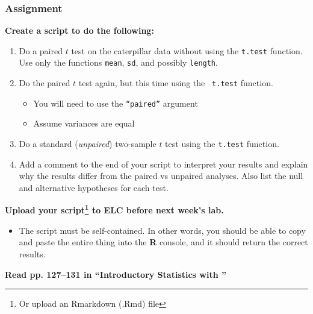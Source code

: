 \documentclass[color=usenames,dvipsnames]{beamer}\usepackage[]{graphicx}\usepackage[]{color}
\newcommand{\inr}[1]{\colorbox{inlinecolor}{\texttt{#1}}}
\begin{document}







\begin{frame}
  \frametitle{Assignment}
  \footnotesize
  {\bf Create a script to do the following:}
  \begin{enumerate}[\bf (1)]
    \item Do a paired $t$ test on the caterpillar data without using the \inr{t.test}
      function. Use only the functions \inr{mean}, \inr{sd}, and
      possibly \inr{length}.
    \item Do the paired $t$ test again, but this time using the \inr{
        t.test} function.
      \begin{itemize}
        \scriptsize
        \item You will need to use the \texttt{``paired''} argument %
        \item Assume variances are equal
      \end{itemize}
    \item Do a standard ({\it unpaired}) two-sample $t$ test using
      the \inr{t.test} function.
    \item Add a comment to the end of your script to interpret your
      results and explain why the results differ from the paired vs
      unpaired analyses. Also list the null and alternative hypotheses for
      each test. %
  \end{enumerate}
  \vfill
  {\bf Upload your script\footnote{\scriptsize Or upload an Rmarkdown
      (.Rmd) file} to ELC before next week's lab.}
  \begin{itemize}
    \item The script must be self-contained. In other words, you
      should be able to copy and paste the entire thing into the {\bf
        R} console, and it should return the correct results.
  \end{itemize}
  \vfill
   {\bf Read pp. 127--131 in ``Introductory Statistics with \R''}
\end{frame}
\end{document}
